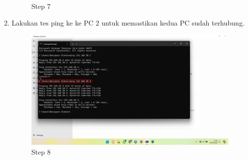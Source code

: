 \begin{center}
\begin{enumerate}
\begin{figure}[H]
			\caption{Step 7}
			\label{fig:Step 7(PC 1)}
		\end{figure}
        \item Lakukan tes ping ke ke PC 2 untuk memastikan kedua PC sudah terhubung.
        \begin{figure}[H]
			\centering
			\includegraphics[width=0.8\linewidth]{P4/img/pc1/Step 7.png}
			\caption{Step 8}
			\label{fig:Step 8(PC 1)}
		\end{figure}
    \end{enumerate}


\end{center}
